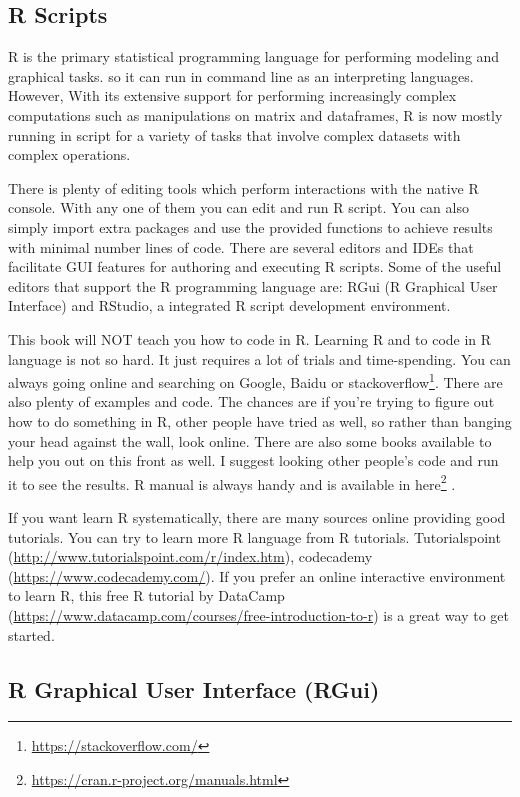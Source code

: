 \documentclass[
]{book}
\renewcommand{\href}[2]{#2\footnote{\url{#1}}}
\begin{document}
\hypertarget{r-scripts}{%
\subsection{R Scripts}\label{r-scripts}}

R is the primary statistical programming language for performing modeling and graphical tasks. so it can run in command line as an interpreting languages. However, With its extensive support for performing increasingly complex computations such as manipulations on matrix and dataframes, R is now mostly running in script for a variety of tasks that involve complex datasets with complex operations.

There is plenty of editing tools which perform interactions with the native R console. With any one of them you can edit and run R script. You can also simply import extra packages and use the provided functions to achieve results with minimal number lines of code. There are several editors and IDEs that facilitate GUI features for authoring and executing R scripts. Some of the useful editors that support the R programming language are: RGui (R Graphical User Interface) and RStudio, a integrated R script development environment.

This book will NOT teach you how to code in R. Learning R and to code in R language is not so hard. It just requires a lot of trials and time-spending. You can always going online and searching on Google, Baidu or \href{https://stackoverflow.com/}{stackoverflow}. There are also plenty of examples and code. The chances are if you're trying to figure out how to do something in R, other people have tried as well, so rather than banging your head against the wall, look online. There are also some books available to help you out on this front as well. I suggest looking other people's code and run it to see the results. R manual is always handy and is available in \href{https://cran.r-project.org/manuals.html}{here} .

If you want learn R systematically, there are many sources online providing good tutorials. You can try to learn more R language from R tutorials. Tutorialspoint (\url{http://www.tutorialspoint.com/r/index.htm}), codecademy (\url{https://www.codecademy.com/}). If you prefer an online interactive environment to learn R, this free R tutorial by DataCamp (\url{https://www.datacamp.com/courses/free-introduction-to-r}) is a great way to get started.

\hypertarget{r-graphical-user-interface-rgui}{%
\subsection{R Graphical User Interface (RGui)}\label{r-graphical-user-interface-rgui}}
\end{document}
